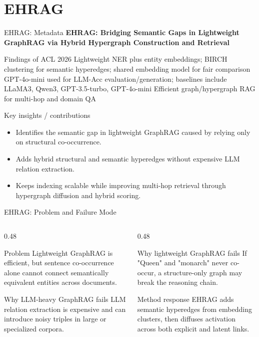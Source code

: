 \section{EHRAG}

\begin{frame}{EHRAG: Metadata}
\small
\textbf{EHRAG: Bridging Semantic Gaps in Lightweight GraphRAG via Hybrid Hypergraph Construction and Retrieval}

\paperinfo
{Findings of ACL 2026}
{Lightweight NER plus entity embeddings; BIRCH clustering for semantic hyperedges; shared embedding model for fair comparison}
{GPT-4o-mini used for LLM-Acc evaluation/generation; baselines include LLaMA3, Qwen3, GPT-3.5-turbo, GPT-4o-mini}
{Efficient graph/hypergraph RAG for multi-hop and domain QA}

\begin{block}{Key insights / contributions}
\scriptsize
\begin{itemize}
  \item Identifies the semantic gap in lightweight GraphRAG caused by relying only on structural co-occurrence.
  \item Adds hybrid structural and semantic hyperedges without expensive LLM relation extraction.
  \item Keeps indexing scalable while improving multi-hop retrieval through hypergraph diffusion and hybrid scoring.
\end{itemize}
\end{block}
\end{frame}

\begin{frame}{EHRAG: Problem and Failure Mode}
\scriptsize
\begin{columns}[T,onlytextwidth]
  \begin{column}{0.48\textwidth}
    \begin{block}{Problem}
      Lightweight GraphRAG is efficient, but sentence co-occurrence alone cannot connect semantically equivalent entities across documents.
    \end{block}
    \begin{block}{Why LLM-heavy GraphRAG fails}
      LLM relation extraction is expensive and can introduce noisy triples in large or specialized corpora.
    \end{block}
  \end{column}
  \begin{column}{0.48\textwidth}
    \begin{block}{Why lightweight GraphRAG fails}
      If "Queen" and "monarch" never co-occur, a structure-only graph may break the reasoning chain.
    \end{block}
    \begin{block}{Method response}
      EHRAG adds semantic hyperedges from embedding clusters, then diffuses activation across both explicit and latent links.
    \end{block}
  \end{column}
\end{columns}
\end{frame}

